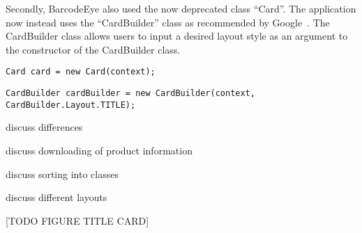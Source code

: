 Secondly, BarcodeEye also used the now deprecated class ``Card''. The application now instead uses the ``CardBuilder'' class as recommended by Google~\cite{googleCard}. The CardBuilder class allows users to input a desired layout style as an argument to the constructor of the CardBuilder class.

\begin{lstlisting}
Card card = new Card(context);
\end{lstlisting}

\begin{lstlisting}
CardBuilder cardBuilder = new CardBuilder(context, CardBuilder.Layout.TITLE);
\end{lstlisting}



discuss differences

discuss downloading of product information

discuss sorting into classes

discuss different layouts

[TODO FIGURE TITLE CARD]

